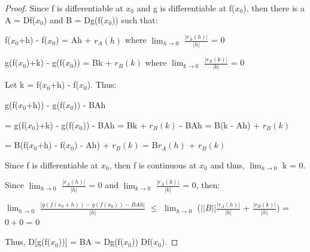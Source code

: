     \begin{proof}
        Since f is differentiable at $x_0$ and g is differentiable at f($x_0$),
        then there is a A = Df($x_0$) and B = Dg(f($x_0$)) such that:

        \hspace{0.5cm}
        f($x_0$+h) - f($x_0$)
        = Ah + $r_A(h)$
        \hspace{2cm}
        where $\lim_{h \rightarrow 0}$ $\frac{|r_A(h)|}{|h|}$ = 0

        \hspace{0.5cm}
        g(f($x_0$)+k) - g(f($x_0$))
        = Bk + $r_B(k)$
        \hspace{1cm}
        where $\lim_{k \rightarrow 0}$ $\frac{|r_B(k)|}{|k|}$ = 0

        Let k = f($x_0$+h) - f($x_0$). Thus:

        \hspace{0.5cm}
        g(f($x_0$+h)) - g(f($x_0$)) - BAh

        \hspace{0.5cm}
        = g(f($x_0$)+k) - g(f($x_0$)) - BAh
        = Bk + $r_B(k)$ - BAh
        = B(k - Ah) + $r_B(k)$

        \hspace{0.5cm}
        = B(f($x_0$+h) - f($x_0$) - Ah) + $r_B(k)$
        = B$r_A(h)$ + $r_B(k)$

        Since f is differentiable at $x_0$, then f is continuous at $x_0$
        and thus, $\lim_{h \rightarrow 0}$ k = 0.

        Since $\lim_{h \rightarrow 0}$ $\frac{|r_A(h)|}{|h|}$ = 0
        and $\lim_{k \rightarrow 0}$ $\frac{|r_A(k)|}{|k|}$ = 0, then:

        \hspace{0.5cm}
        $\lim_{h \rightarrow 0}$ $\frac{| g(f(x_0+h)) - g(f(x_0)) - BAh|}{|h|}$
        $\leq$ $\lim_{h \rightarrow 0}$ ($||B|| \frac{|r_A(h)|}{|h|}$
                + $\frac{|r_B(k)|}{|h|}$)
        = $0+0$ = 0

        Thus, D[g(f($x_0$))] = BA = Dg(f($x_0$)) Df($x_0$).
    \end{proof}

    \newpage



